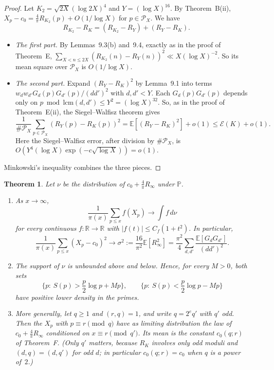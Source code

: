 \documentclass[11pt]{amsart}
\newtheorem{theorem}{Theorem}
\theoremstyle{remark}
\newcommand{\E}{\mathbb{E}}
\newcommand{\Prob}{\mathbb{P}}
\begin{document}
\begin{proof}
Let $K_2=\sqrt{2X}(\log2X)^4$ and $Y=(\log X)^{16}$. By Theorem~B(ii), $X_p-c_0=\frac4\pi R_{K_2}(p)+O(1/\log X)$ for $p\in\mathcal P_X$. We have
\[
R_{K_2}-R_K=(R_{K_2}-R_Y)+(R_Y-R_K).
\]
\begin{itemize}
\item \emph{The first part.} By Lemmas~9.3(b) and~9.4, exactly as in the proof of Theorem~E, $\sum_{X<n\le2X}(R_{K_2}(n)-R_Y(n))^2\ll X(\log X)^{-2}$. So its mean square over $\mathcal P_X$ is $O(1/\log X)$.
\item \emph{The second part.} Expand $(R_Y-R_K)^2$ by Lemma~9.1 into terms $w_dw_{d'}G_d(p)G_{d'}(p)/(dd')^2$ with $d,d'<Y$. Each $G_d(p)G_{d'}(p)$ depends only on $p\bmod\mathrm{lcm}(d,d')\le Y^2=(\log X)^{32}$. So, as in the proof of Theorem~E(ii), the Siegel--Walfisz theorem gives
\[
\frac1{\#\mathcal P_X}\sum_{p\in\mathcal P_X}(R_Y(p)-R_K(p))^2=\E[(R_Y-R_K)^2]+o(1)\le\mathcal E(K)+o(1).
\]
Here the Siegel--Walfisz error, after division by $\#\mathcal P_X$, is $O(Y^4(\log X)\exp(-c\sqrt{\log X}))=o(1)$.
\end{itemize}
Minkowski's inequality combines the three pieces.
\end{proof}

\begin{theorem}\label{thm:G}
Let $\nu$ be the distribution of $c_0+\frac4\pi R_\infty$ under $\Prob$.
\begin{enumerate}
\item[(a)] As $x\to\infty$,
\[
\frac1{\pi(x)}\sum_{p\le x}f(X_p)\to\int f\,d\nu
\]
for every continuous $f:\mathbb R\to\mathbb R$ with $|f(t)|\le C_f(1+t^2)$. In particular,
\[
\frac1{\pi(x)}\sum_{p\le x}(X_p-c_0)^2\to\sigma^2:=\frac{16}{\pi^2}\E[R_\infty^2]=\frac{\pi^2}4\sum_{d,d'}\frac{\E[G_dG_{d'}]}{(dd')^2}.
\]
\item[(b)] The support of $\nu$ is unbounded above and below. Hence, for every $M>0$, both sets
\[
\Big\{p:\ S(p)>\frac p2\log p+Mp\Big\},\qquad \Big\{p:\ S(p)<\frac p2\log p-Mp\Big\}
\]
have positive lower density in the primes.
\item[(c)] More generally, let $q\ge1$ and $(r,q)=1$, and write $q=2^{e}q'$ with $q'$ odd. Then the $X_p$ with $p\equiv r\pmod q$ have as limiting distribution the law of $c_0+\frac4\pi R_\infty$ conditioned on $x\equiv r\pmod{q'}$. Its mean is the constant $c_0(q;r)$ of Theorem~F. (Only $q'$ matters, because $R_K$ involves only odd moduli and $(d,q)=(d,q')$ for odd $d$; in particular $c_0(q;r)=c_0$ when $q$ is a power of~$2$.)
\end{enumerate}
\end{theorem}
\end{document}
